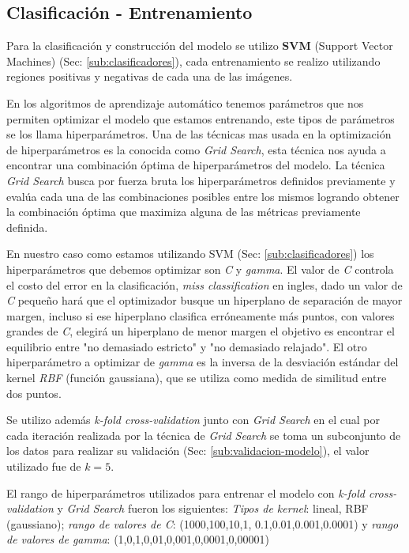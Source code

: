 \subsection*{Clasificación - Entrenamiento}\label{sub:entr_class}

Para la clasificación y construcción del modelo se utilizo \textbf{SVM} (Support Vector Machines) (Sec: \ref{sub:clasificadores}), cada entrenamiento se realizo utilizando regiones positivas y negativas de cada una de las imágenes.

En los algoritmos de aprendizaje automático tenemos parámetros que nos permiten optimizar el modelo que estamos entrenando, este tipos de parámetros se los llama hiperparámetros. Una de las técnicas mas usada en la optimización de hiperparámetros es la conocida como \textit{Grid Search}, esta técnica nos ayuda a encontrar una combinación óptima de hiperparámetros del modelo. La técnica \textit{Grid Search} busca por fuerza bruta los hiperparámetros definidos previamente y evalúa cada una de las combinaciones posibles entre los mismos logrando obtener la combinación óptima que maximiza alguna de las métricas previamente definida. 

En nuestro caso como estamos utilizando SVM (Sec: \ref{sub:clasificadores}) los hiperparámetros que debemos optimizar son \textit{C} y \textit{gamma}. El valor de \textit{C} controla el costo del error en la clasificación, \textit{miss classification} en ingles, dado un valor de \textit{C} pequeño hará que el optimizador busque un hiperplano de separación de mayor margen, incluso si ese hiperplano clasifica erróneamente más puntos, con valores grandes de \textit{C},  elegirá un hiperplano de menor margen el objetivo es encontrar el equilibrio entre "no demasiado estricto" y  "no demasiado relajado". El otro hiperparámetro a  optimizar de  \textit{gamma} es la inversa de la desviación estándar del kernel \textit{RBF} (función gaussiana), que se utiliza como medida de similitud entre dos puntos.

Se utilizo además \textit{k-fold cross-validation} junto con \textit{Grid Search} en el cual por cada iteración realizada por la técnica de \textit{Grid Search} se toma un subconjunto de los datos para realizar su validación (Sec: \ref{sub:validacion-modelo}), el valor utilizado fue de $k=5$.

El rango de hiperparámetros utilizados para entrenar el modelo con  \textit{k-fold cross-validation} y \textit{Grid Search} fueron los siguientes: \textit{Tipos de kernel}: lineal, RBF (gaussiano); \textit{rango de valores de C}: (1000,100,10,1, 0.1,0.01,0.001,0.0001)
    y \textit{rango de valores de gamma}: (1,0,1,0,01,0,001,0,0001,0,00001)

